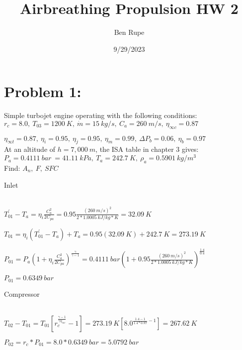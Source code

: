 \documentclass{article}
\begin{document}
	\title{Airbreathing Propulsion HW 2}
\author{Ben Rupe}
\date{9/29/2023}
\maketitle


\section*{Problem 1:}

Simple turbojet engine operating with the following conditions:
\\

$r_c=8.0,\ T_{03}=1200\ K,\ \dot{m}=15\ kg/s,\ C_a=260\ m/s,\ \eta_{\infty c}=0.87$

$\eta_{\infty t}=0.87,\ \eta_i=0.95,\ \eta_j=0.95,\ \eta_m=0.99,\ \Delta P_b=0.06,\ \eta_b=0.97$
\\

At an altitude of $h=7,000\ m$, the ISA table in chapter 3 gives: 
\\

$P_a=0.4111\ bar\ =41.11\ kPa,\ T_a=242.7\ K,\ \rho_a=0.5901\ kg/m^{3}$
\\

Find: $A_n,\ F,\ SFC$
\\

	\begin{Large}
		Inlet
	\end{Large}
\\

$T_{01}^{'}-T_a=\eta_i \frac{C_a ^{2}}{2 C_{pa}} = 0.95 \frac{(260\ m/s) ^{2}}{2*1.0005\ kJ/kg*K} = 32.09\ K$

$T_{01}=\eta_i (T_{01}^{'}-T_a)+T_a = 0.95(32.09\ K)+242.7\ K = 273.19\ K$

$P_{01}=P_a (1+\eta_i \frac{C_a ^{2}}{2 C_{pa}})^{\frac{\gamma}{\gamma-1}} = 0.4111\ bar (1+0.95 \frac{(260\ m/s) ^{2}}{2*1.0005\ kJ/kg*K})^{\frac{1.4}{0.4}}$

$P_{01}=0.6349\ bar$
\\

	\begin{Large}
		Compressor
	\end{Large}
\\

$T_{02}-T_{01}=T_{01}[r_c ^{\frac{\gamma-1}{\gamma \eta_{\infty c}}}-1]=273.19\ K[8.0 ^{\frac{1.4-1}{1.4*0.87}-1}]=267.62\ K$

$P_{02}=r_c * P_{01}=8.0*0.6349\ bar=5.0792\ bar$
\end{document}
